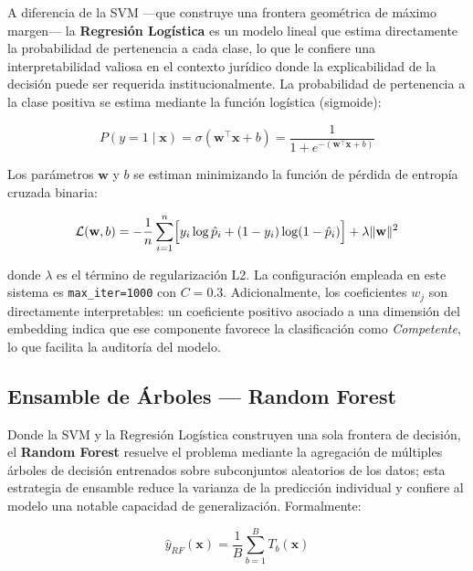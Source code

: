 A diferencia de la SVM —que construye una frontera geométrica de máximo margen—
la \textbf{Regresión Logística} es un modelo lineal que estima directamente la
probabilidad de pertenencia a cada clase, lo que le confiere una interpretabilidad
valiosa en el contexto jurídico donde la explicabilidad de la decisión puede ser
requerida institucionalmente. La probabilidad de pertenencia a la clase positiva
se estima mediante la función logística (sigmoide):

\begin{equation}
  P(y = 1 \mid \mathbf{x})
  = \sigma(\mathbf{w}^\top \mathbf{x} + b)
  = \frac{1}{1 + e^{-(\mathbf{w}^\top \mathbf{x} + b)}}
  \label{eq:logistica}
\end{equation}

Los parámetros $\mathbf{w}$ y $b$ se estiman minimizando la función de pérdida
de entropía cruzada binaria:

\begin{equation}
  \mathcal{L}(\mathbf{w}, b)
  = -\frac{1}{n} \sum_{i=1}^n
    \Bigl[y_i \log \hat{p}_i + (1 - y_i) \log(1 - \hat{p}_i)\Bigr]
  + \lambda \|\mathbf{w}\|^2
  \label{eq:cross-entropy}
\end{equation}

donde $\lambda$ es el término de regularización L2. La configuración empleada
en este sistema es \texttt{max\_iter=1000} con $C = 0.3$. Adicionalmente, los
coeficientes $w_j$ son directamente interpretables: un coeficiente positivo
asociado a una dimensión del embedding indica que ese componente favorece la
clasificación como \textit{Competente}, lo que facilita la auditoría del modelo.

\subsection{Ensamble de Árboles — Random Forest}

Donde la SVM y la Regresión Logística construyen una sola frontera de decisión,
el \textbf{Random Forest} resuelve el problema mediante la agregación de múltiples
árboles de decisión entrenados sobre subconjuntos aleatorios de los datos; esta
estrategia de ensamble reduce la varianza de la predicción individual y confiere
al modelo una notable capacidad de generalización. \cite{breiman2001} Formalmente:

\begin{equation}
  \hat{y}_{RF}(\mathbf{x})
  = \frac{1}{B} \sum_{b=1}^{B} T_b(\mathbf{x})
  \label{eq:rf}
\end{equation}


